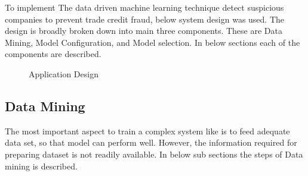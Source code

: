 To implement The data driven machine learning technique detect suspicious companies to prevent trade credit fraud, below system design was used. The design is broadly broken down into main three components. These are Data Mining, Model Configuration, and Model selection. In below sections each of the components are described. 


\begin{figure}[h]
    \centering
    \caption{Application Design}
    \label{fig:my_label}
\end{figure}

\subsection{Data Mining}
The most important aspect to train a complex system like is to feed adequate data set, so that model can perform well. However, the information required for preparing dataset is not readily available. In below sub sections the steps of Data mining is described. 

